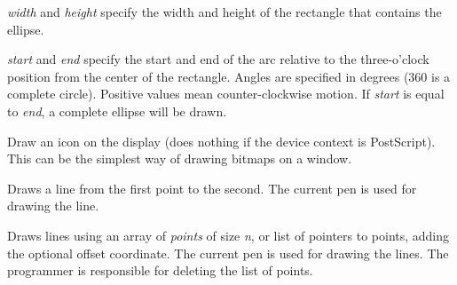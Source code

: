 {\it width} and {\it height} specify the width and height of the rectangle that contains
the ellipse.

{\it start} and {\it end} specify the start and end of the arc relative to the three-o'clock
position from the center of the rectangle. Angles are specified
in degrees (360 is a complete circle). Positive values mean
counter-clockwise motion. If {\it start} is equal to {\it end}, a
complete ellipse will be drawn.

\label{wxsvgfiledcdrawicon}


Draw an icon on the display (does nothing if the device context is PostScript).
This can be the simplest way of drawing bitmaps on a window.

\label{wxsvgfiledcdrawline}


Draws a line from the first point to the second. The current pen is used
for drawing the line.

\label{wxsvgfiledcdrawlines}



Draws lines using an array of {\it points} of size {\it n}, or list of
pointers to points, adding the optional offset coordinate. The current
pen is used for drawing the lines.  The programmer is responsible for
deleting the list of points.

\label{wxsvgfiledcdrawpolygon}



